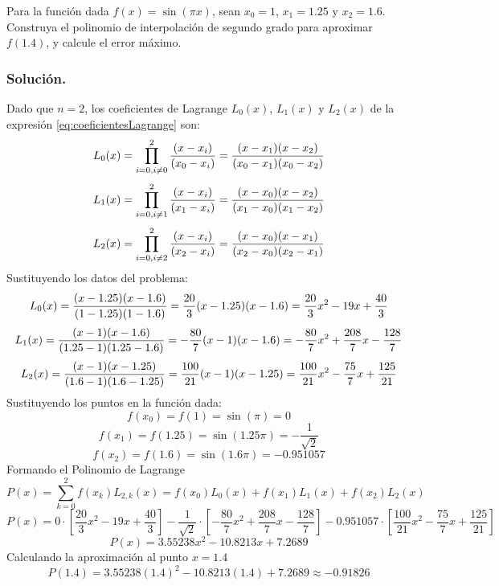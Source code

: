 \begin{exerciseT}
Para la función dada $f(x) = \sin (\pi x)$, sean $x_0=1$, $x_1=1.25$ y $x_2=1.6$. Construya el polinomio de interpolación 
de segundo grado para aproximar $f(1.4)$, y calcule el error máximo.\\
	\subsubsection*{Solución.} Dado que $n=2$, los coeficientes de Lagrange $L_0(x)$, $L_1(x)$ y $L_2(x)$ de la expresión \ref{eq:coeficientesLagrange} son:
			$$L_0(x) = \prod_{i=0, i\not= 0}^{2} {(x-x_i) \over (x_0 - x_i)} = {(x-x_1)(x-x_2)\over (x_0-x_1)(x_0-x_2)}$$	
			$$L_1(x) = \prod_{i=0, i\not= 1}^{2} {(x-x_i) \over (x_1 - x_i)} = {(x-x_0)(x-x_2)\over (x_1-x_0)(x_1-x_2)}$$	
			$$L_2(x) = \prod_{i=0, i\not= 2}^{2} {(x-x_i) \over (x_2 - x_i)} = {(x-x_0)(x-x_1)\over (x_2-x_0)(x_2-x_1)}$$	
		Sustituyendo los datos del problema:
			$$L_0(x) = {(x-1.25)(x-1.6)\over (1-1.25)(1-1.6)} = \frac{20}{3}(x-1.25)(x-1.6) = \frac{20}{3}x^2 - 19x + \frac{40}{3}$$
			$$L_1(x) = {(x-1)(x-1.6)\over (1.25-1)(1.25-1.6)} = -\frac{80}{7}(x-1)(x-1.6) = -\frac{80}{7}x^2 + \frac{208}{7}x - \frac{128}{7}$$
			$$L_2(x) = {(x-1)(x-1.25)\over (1.6-1)(1.6-1.25)} = \frac{100}{21}(x-1)(x-1.25) = \frac{100}{21}x^2 - \frac{75}{7}x + \frac{125}{21}$$
		Sustituyendo los puntos en la función dada:
			$$f(x_0) = f(1) = \sin (\pi) = 0$$
			$$f(x_1) = f(1.25) = \sin (1.25\pi) = -\frac{1}{\sqrt{2}}$$
			$$f(x_2) = f(1.6) = \sin (1.6\pi) = -0.951057$$
		Formando el Polinomio de Lagrange
			$$P(x) = \sum_{k=0}^2 f(x_k)L_{2,k}(x) = f(x_0)L_0(x) + f(x_1)L_1(x) + f(x_2)L_2(x)$$
			$$P(x) = 0\cdot \left[ \frac{20}{3}x^2 - 19x + \frac{40}{3} \right] - \frac{1}{\sqrt{2}}\cdot \left[-\frac{80}{7}x^2 + \frac{208}{7}x 
			- \frac{128}{7}\right]
			-0.951057\cdot \left[ \frac{100}{21}x^2 - \frac{75}{7}x + \frac{125}{21} \right]$$
			$$P(x) = 3.55238x^2 - 10.8213x + 7.2689$$
		Calculando la aproximación al punto $x=1.4$
			$$P(1.4) = 3.55238(1.4)^2 - 10.8213(1.4) + 7.2689 \approx -0.91826$$
\end{exerciseT}

